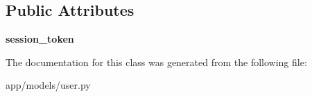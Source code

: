 \subsection*{Public Attributes}
\begin{DoxyCompactItemize}
\item 
\mbox{\label{classapp_1_1models_1_1user_1_1_user_document_a3b42abe804f60f01564865ac54232b50}} 
{\bfseries session\+\_\+token}
\end{DoxyCompactItemize}


The documentation for this class was generated from the following file\+:\begin{DoxyCompactItemize}
\item 
app/models/user.\+py\end{DoxyCompactItemize}
